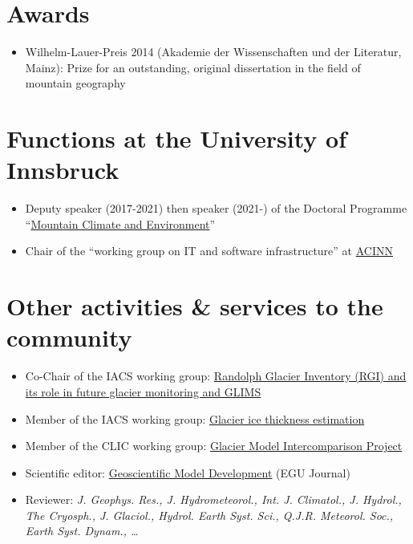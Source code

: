 \section*{Awards}
\label{\detokenize{ch08/cv:awards}}\begin{itemize}[nosep]
\item {} 
Wilhelm-Lauer-Preis 2014 (Akademie der Wissenschaften und der Literatur, Mainz): Prize for an outstanding,
original dissertation in the field of mountain geography

\end{itemize}


\section*{Functions at the University of Innsbruck}
\label{\detokenize{ch08/cv:functions-at-the-university-of-innsbruck}}\begin{itemize}[nosep]
\item {} 
Deputy speaker (2017-2021) then speaker (2021-) of the Doctoral Programme “\href{https://www.uibk.ac.at/alpinerraum/dps/dp-mountainclimate/}{Mountain Climate and Environment}”

\item {} 
Chair of the “working group on IT and software infrastructure” at \href{https://www.uibk.ac.at/acinn}{ACINN}

\end{itemize}


\section*{Other activities \& services to the community}
\label{\detokenize{ch08/cv:other-activities-services-to-the-community}}\begin{itemize}[nosep]
\item {} 
Co-Chair of the IACS working group: \href{https://cryosphericsciences.org/activities/working-groups/rgi-working-group/}{Randolph Glacier Inventory (RGI) and its role in future glacier monitoring and GLIMS}

\item {} 
Member of the IACS working group: \href{https://cryosphericsciences.org/activities/ice-thickness/}{Glacier ice thickness estimation}

\item {} 
Member of the CLIC working group: \href{http://www.climate-cryosphere.org/mips/glaciermip}{Glacier Model Intercomparison Project}

\item {} 
Scientific editor: \href{https://www.geosci-model-dev.net/}{Geoscientific Model Development} (EGU Journal)

\item {} 
Reviewer: \textit{J. Geophys. Res., J. Hydrometeorol., Int. J. Climatol., J. Hydrol., The Cryosph., J. Glaciol., Hydrol. Earth Syst. Sci., Q.J.R. Meteorol. Soc., Earth Syst. Dynam., …}

\end{itemize}


